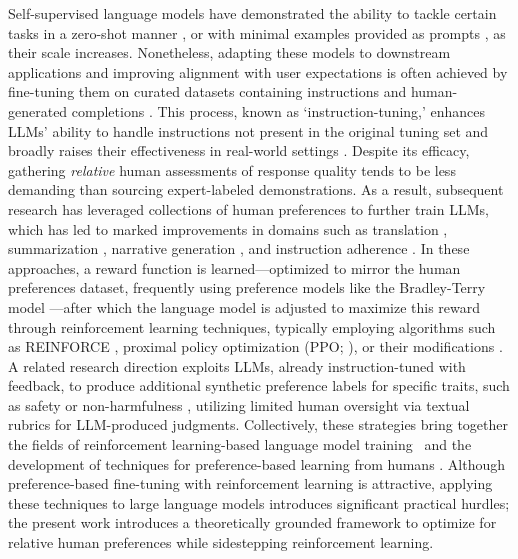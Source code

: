 Self-supervised language models have demonstrated the ability to tackle certain tasks in a zero-shot manner \citep{radford2019language}, or with minimal examples provided as prompts \citep{gpt3,megatron,chowdhery2022palm}, as their scale increases. Nonetheless, adapting these models to downstream applications and improving alignment with user expectations is often achieved by fine-tuning them on curated datasets containing instructions and human-generated completions \citep{mishra-etal-2022-cross,sanh2022multitask,chung2022scaling,thoppilan2022lamda}. This process, known as `instruction-tuning,' enhances LLMs’ ability to handle instructions not present in the original tuning set and broadly raises their effectiveness in real-world settings \citep{chung2022scaling}. Despite its efficacy, gathering \textit{relative} human assessments of response quality tends to be less demanding than sourcing expert-labeled demonstrations. As a result, subsequent research has leveraged collections of human preferences to further train LLMs, which has led to marked improvements in domains such as translation \citep{kreutzer-etal-2018-reliability}, summarization \citep{stiennon2022learning,ziegler2020finetuning}, narrative generation \citep{ziegler2020finetuning}, and instruction adherence \citep{ouyang2022training,ramamurthy2023is}. In these approaches, a reward function is learned—optimized to mirror the human preferences dataset, frequently using preference models like the Bradley-Terry model \citep{bradley1952rankanalysis}—after which the language model is adjusted to maximize this reward through reinforcement learning techniques, typically employing algorithms such as REINFORCE \citep{williams1992reinforce}, proximal policy optimization (PPO; \cite{schulman2017proximal}), or their modifications \citep{ramamurthy2023is}. A related research direction exploits LLMs, already instruction-tuned with feedback, to produce additional synthetic preference labels for specific traits, such as safety or non-harmfulness \citep{bai2022constitutional}, utilizing limited human oversight via textual rubrics for LLM-produced judgments. Collectively, these strategies bring together the fields of reinforcement learning-based language model training~\citep{Ranzato2015SequenceLT,paulus2018a,wu2018learning} and the development of techniques for preference-based learning from humans \citep{christiano2017deep,kupcsik2018learning}. Although preference-based fine-tuning with reinforcement learning is attractive, applying these techniques to large language models introduces significant practical hurdles; the present work introduces a theoretically grounded framework to optimize for relative human preferences while sidestepping reinforcement learning.


